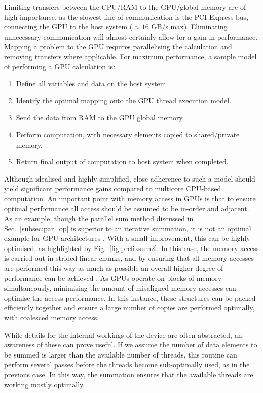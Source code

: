 Limiting transfers between the CPU/RAM to the GPU/global memory are of high importance, as the slowest line of communication is the PCI-Express bus, connecting the GPU to the host system ($\approx 16 $ GB/s max). Eliminating unnecessary communication will almost certainly allow for a gain in performance. Mapping a problem to the GPU requires parallelising the calculation and removing transfers where applicable. For maximum performance, a sample model of performing a GPU calculation is:
\begin{enumerate}
    \item Define all variables and data on the host system.
    \item Identify the optimal mapping onto the GPU thread execution model.
    \item Send the data from RAM to the GPU global memory.
    \item Perform computation, with necessary elements copied to shared/private memory.
    \item Return final output of computation to host system when completed.
\end{enumerate}

Although idealised and highly simplified, close adherence to such a model should yield significant performance gains compared to multicore CPU-based computation. An important point with memory access in GPUs is that to ensure optimal performance all access should be assumed to be in-order and adjacent. As an example, though the parallel sum method discussed in Sec.~\ref{subsec:par_op} is superior to an iterative summation, it is not an optimal example for GPU architectures \cite{BK:Cuda_book}. With a small improvement, this can be highly optimised, as highlighted by Fig.~\ref{fig:prefixsum2}. In this case, the memory access is carried out in strided linear chunks, and by ensuring that all memory accesses are performed this way as much as possible an overall higher degree of performance can be achieved \cite{BK:Cuda_book}. As GPUs operate on blocks of memory simultaneously, minimising the amount of misaligned memory accesses can optimise the access performance. In this instance, these structures can be packed efficiently together and ensure a large number of copies are performed optimally, with coalesced memory access.

While details for the internal workings of the device are often abstracted, an awareness of these can prove useful. If we assume the number of data elements to be summed is larger than the available number of threads, this routine can perform several passes before the threads become sub-optimally used, as in the previous case. In this way, the summation ensures that the available threads are working mostly optimally.

